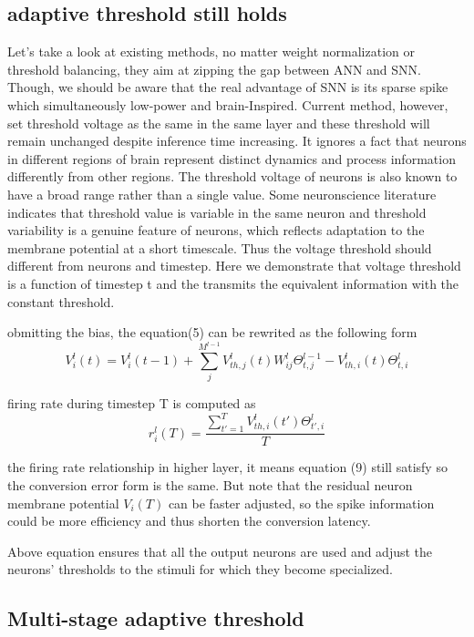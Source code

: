 \documentclass{article}
\begin{document}
\subsection{adaptive threshold still holds}
Let's take a look at existing methods, no matter weight normalization or threshold balancing, they aim at zipping the gap between ANN and SNN. Though, we should be aware that
the real advantage of SNN is its sparse spike which simultaneously low-power and brain-Inspired. Current method, however, set threshold voltage as the same in the same layer and 
these threshold will remain unchanged despite inference time increasing. It ignores a fact that neurons in different
regions of brain represent distinct dynamics and process information differently from other regions. 
The threshold voltage of neurons is also known to have a broad
range rather than a single value. Some neuronscience literature indicates that threshold value 
is variable in the same neuron and threshold 
variability is a genuine feature of neurons, which reflects 
adaptation to the membrane potential at a short 
timescale. Thus the voltage threshold should different from neurons and timestep. Here we demonstrate that voltage threshold is a function of timestep t and the transmits the equivalent information with the constant threshold.

obmitting the bias, the equation(5) can be rewrited as the following form
\begin{equation}
  V_i^l(t)=V_{i}^{l}(t-1)+\sum_j^{M^{l-1}}V_{th,j}^l(t)W_{ij}^l\Theta_{t,j}^{l-1} -V_{th,i}^l(t)\Theta_{t,i}^{l}
\end{equation}

firing rate during timestep T is computed as 
\begin{equation}
  r_i^l(T) = \frac{\sum_{t'=1}^{T}V_{th,i}^l(t')\Theta_{t',i}^{l}}{T}
\end{equation}

the firing rate relationship in higher layer, it means equation (9) still satisfy so the conversion error form is the same.
But note that the residual neuron membrane potential $V_i(T)$ can be faster adjusted, so the spike information could be more efficiency and thus shorten the conversion latency. 

Above equation ensures that all the output neurons are used and adjust the neurons' thresholds to the stimuli for which they become specialized. 

\subsection{Multi-stage adaptive threshold}
\end{document}

